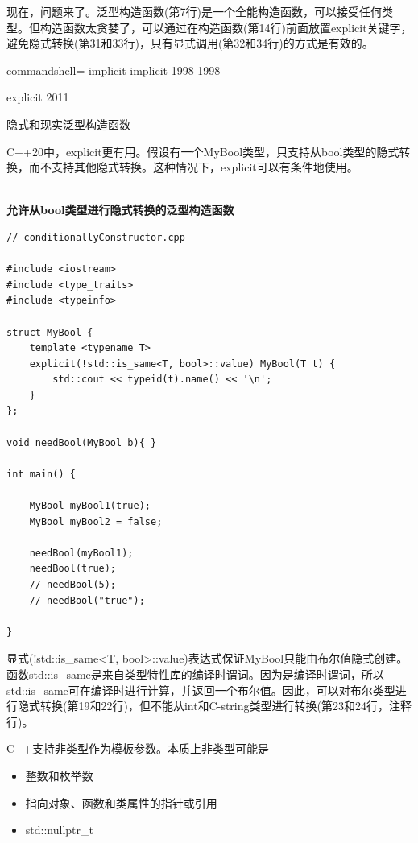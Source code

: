 现在，问题来了。泛型构造函数(第7行)是一个全能构造函数，可以接受任何类型。但构造函数太贪婪了，可以通过在构造函数(第14行)前面放置explicit关键字，避免隐式转换(第31和33行)，只有显式调用(第32和34行)的方式是有效的。

\begin{tcblisting}{commandshell={}}
implicit
implicit
1998
1998

explicit
2011
\end{tcblisting}

\begin{center}
隐式和现实泛型构造函数
\end{center}

C++20中，explicit更有用。假设有一个MyBool类型，只支持从bool类型的隐式转换，而不支持其他隐式转换。这种情况下，explicit可以有条件地使用。

\hspace*{\fill} \\ %
\noindent
\textbf{允许从bool类型进行隐式转换的泛型构造函数}
\begin{lstlisting}[style=styleCXX]
// conditionallyConstructor.cpp

#include <iostream>
#include <type_traits>
#include <typeinfo>

struct MyBool {
	template <typename T>
	explicit(!std::is_same<T, bool>::value) MyBool(T t) {
		std::cout << typeid(t).name() << '\n';
	}
};

void needBool(MyBool b){ }

int main() {

	MyBool myBool1(true);
	MyBool myBool2 = false;
	
	needBool(myBool1);
	needBool(true);
	// needBool(5);
	// needBool("true");

}
\end{lstlisting}

显式(!std::is\_same<T, bool>::value)表达式保证MyBool只能由布尔值隐式创建。函数std::is\_same是来自\href{https://en.cppreference.com/w/cpp/header/type_traits}{类型特性库}的编译时谓词。因为是编译时谓词，所以std::is\_same可在编译时进行计算，并返回一个布尔值。因此，可以对布尔类型进行隐式转换(第19和22行)，但不能从int和C-string类型进行转换(第23和24行，注释行)。


C++支持非类型作为模板参数。本质上非类型可能是

\begin{itemize}
\item 
整数和枚举数

\item 
指向对象、函数和类属性的指针或引用

\item 
std::nullptr\_t
\end{itemize}

